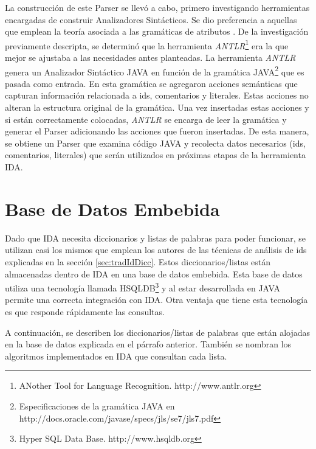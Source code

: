 La construcción de este Parser se llevó a cabo, primero investigando herramientas encargadas de construir Analizadores Sintácticos. Se dio preferencia a aquellas que emplean la teoría asociada a las gramáticas de atributos \cite{AHUL06}. De la investigación previamente descripta, se determinó que la herramienta \textit{ANTLR}\footnote[1]{ANother Tool for Language Recognition. http://www.antlr.org} era la que mejor se ajustaba a las necesidades antes planteadas. La herramienta \textit{ANTLR} genera un Analizador Sintáctico JAVA en función de la gramática JAVA\footnote[2]{Especificaciones de la gramática JAVA en http://docs.oracle.com/javase/specs/jls/se7/jls7.pdf} que es pasada como entrada.
En esta gramática se agregaron acciones semánticas que capturan información relacionada a ids, comentarios y literales. Estas acciones no alteran la estructura original de la gramática. Una vez insertadas estas acciones y si están correctamente colocadas, \textit{ANTLR} se encarga de leer la gramática y generar el Parser adicionando las acciones que fueron insertadas. De esta manera, se obtiene un Parser que examina código JAVA y recolecta datos necesarios (ids, comentarios, literales) que serán utilizados en próximas etapas de la herramienta IDA. 

\section{Base de Datos  Embebida}
\label{sec:bseEmb}

Dado que IDA necesita diccionarios y listas de palabras para poder funcionar, se utilizan casi los mismos que emplean los autores de las técnicas de análisis de ids explicadas en la sección \ref{sec:tradIdDicc}. Estos diccionarios/listas están almacenadas dentro de IDA en una base de datos embebida. 
Esta base de datos utiliza una tecnología llamada HSQLDB\footnote[3]{Hyper SQL Data Base. http://www.hsqldb.org} y al estar desarrollada en JAVA permite una correcta integración con IDA.
Otra ventaja que tiene esta tecnología es que responde rápidamente las consultas.

A continuación, se describen los diccionarios/listas de palabras que están alojadas en la base de datos explicada en el párrafo anterior. También se nombran los algoritmos implementados en IDA que consultan cada lista.

